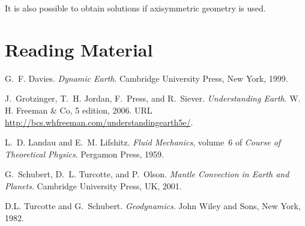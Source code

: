 \documentclass[10pt]{article}
\begin{document}
	It is also possible to obtain solutions if axisymmetric geometry is used.
	
	
\section{Reading Material} 

G.~F. Davies.
\newblock \emph{Dynamic Earth}.
\newblock Cambridge University Press, New York, 1999.

J.~Grotzinger, T.~H. Jordan, F.~Press, and R.~Siever.
\newblock \emph{{Understanding Earth}}.
\newblock W. H. Freeman \& Co, 5 edition, 2006.
\newblock URL \url{http://bcs.whfreeman.com/understandingearth5e/}.

L.~D. Landau and E.~M. Lifshitz.
\newblock \emph{Fluid Mechanics}, volume~6 of \emph{Course of Theoretical
  Physics}.
\newblock Pergamon Press, 1959.

G.~Schubert, D.~L. Turcotte, and P.~Olson.
\newblock \emph{Mantle Convection in {E}arth and Planets}.
\newblock Cambridge University Press, UK, 2001.

D.L. Turcotte and G.~Schubert.
\newblock \emph{Geodynamics}.
\newblock John Wiley and Sons, New York, 1982.

	
	
	
	
\end{document}
